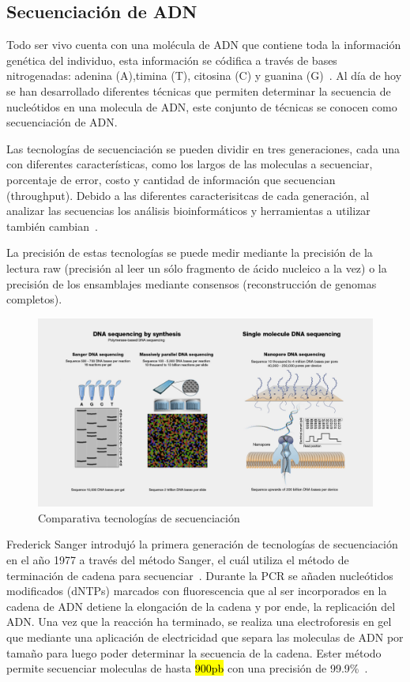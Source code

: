 \subsection{Secuenciación de ADN}
Todo ser vivo cuenta con una molécula de ADN que contiene toda la información genética del individuo, esta información se códifica a través de bases nitrogenadas: adenina (A),timina (T), citosina (C) y guanina (G)~\cite{watson1953molecular}. Al día de hoy se han desarrollado diferentes técnicas que permiten determinar la secuencia de nucleótidos en una molecula de ADN, este conjunto de técnicas se conocen como secuenciación de ADN.

Las tecnologías de secuenciación se pueden dividir en tres generaciones, cada una con diferentes características, como los largos de las moleculas a secuenciar, porcentaje de error, costo y cantidad de información que secuencian (throughput). Debido a las diferentes caracterisitcas de cada generación, al analizar las secuencias los análisis bioinformáticos y herramientas a utilizar también cambian~\cite{bierman2014understanding}.

La precisión de estas tecnologías se puede medir mediante la precisión de la lectura raw (precisión al leer un sólo fragmento de ácido nucleico a la vez) o la precisión de los ensamblajes mediante consensos (reconstrucción de genomas completos).

\begin{figure}[H]
    \centering
    \includegraphics[width=1\linewidth]{images/DNA-Sequencing.jpg}
    \caption{Comparativa tecnologías de secuenciación}
    \label{fig:DNA_sequencing}
\end{figure}


Frederick Sanger introdujó la primera generación de tecnologías de secuenciación en el año 1977 a través del método Sanger, el cuál utiliza el método de terminación de cadena para secuenciar~\cite{sanger1975rapid}. 
Durante la PCR se añaden nucleótidos modificados (dNTPs) marcados con fluorescencia que al ser incorporados en la cadena de ADN detiene la elongación de la cadena y por ende, la replicación del ADN. Una vez que la reacción ha terminado, se realiza una electroforesis en gel que mediante una aplicación de electricidad que separa las moleculas de ADN por tamaño para luego poder determinar la secuencia de la cadena.
Ester método permite secuenciar moleculas de hasta \hl{900pb} con una precisión de 99.9\%~\cite{}.  

